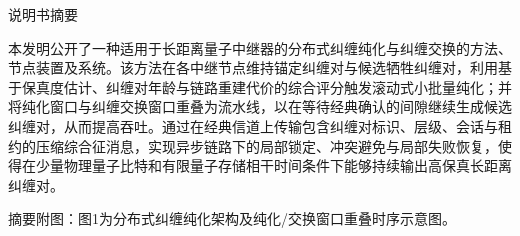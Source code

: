 \documentclass[12pt,a4paper]{article}
\begin{document}
\begin{center}
    {\Huge\heiti 说明书摘要} \\[0.8em]
\end{center}

\noindent
本发明公开了一种适用于长距离量子中继器的分布式纠缠纯化与纠缠交换的方法、节点装置及系统。该方法在各中继节点维持锚定纠缠对与候选牺牲纠缠对，利用基于保真度估计、纠缠对年龄与链路重建代价的综合评分触发滚动式小批量纯化；并将纯化窗口与纠缠交换窗口重叠为流水线，以在等待经典确认的间隙继续生成候选纠缠对，从而提高吞吐。通过在经典信道上传输包含纠缠对标识、层级、会话与租约的压缩综合征消息，实现异步链路下的局部锁定、冲突避免与局部失败恢复，使得在少量物理量子比特和有限量子存储相干时间条件下能够持续输出高保真长距离纠缠对。

\vspace{0.6em}
\noindent
摘要附图：图1为分布式纠缠纯化架构及纯化/交换窗口重叠时序示意图。
\end{document}

